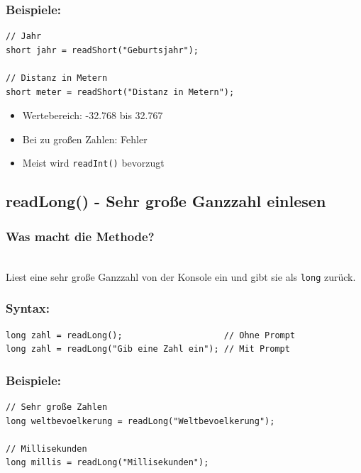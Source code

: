 \subsubsection*{Beispiele:}
\begin{lstlisting}
// Jahr
short jahr = readShort("Geburtsjahr");

// Distanz in Metern
short meter = readShort("Distanz in Metern");
\end{lstlisting}

\begin{achtung}
	\begin{itemize}
		\item Wertebereich: -32.768 bis 32.767
		\item Bei zu großen Zahlen: Fehler
		\item Meist wird \texttt{readInt()} bevorzugt
	\end{itemize}
\end{achtung}

\newpage


\subsection*{readLong() - Sehr große Ganzzahl einlesen}

\subsubsection*{Was macht die Methode?}\\
Liest eine sehr große Ganzzahl von der Konsole ein und gibt sie als \texttt{long} zurück.

\subsubsection*{Syntax:}
\begin{lstlisting}
long zahl = readLong();                    // Ohne Prompt
long zahl = readLong("Gib eine Zahl ein"); // Mit Prompt
\end{lstlisting}

\subsubsection*{Beispiele:}
\begin{lstlisting}
// Sehr große Zahlen
long weltbevoelkerung = readLong("Weltbevoelkerung");

// Millisekunden
long millis = readLong("Millisekunden");
\end{lstlisting}

